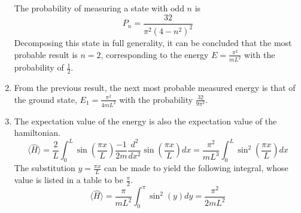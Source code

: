 \begin{sol}
\begin{enumerate}[label=\textbf{(\alph*)}]
The probability of measuring a state with odd $n$ is
\begin{equation}
    P_n=\frac{32}{\pi^2(4-n^2)^2}
\end{equation}
Decomposing this state in full generality, it can be concluded that the most probable result is $n=2$, corresponding to the energy $\displaystyle{E=\frac{\pi^2}{mL^2}}$ with the probability of $\displaystyle{\frac{1}{2}}$.
\item
From the previous result, the next most probable measured energy is that of the ground state, $\displaystyle{E_1=\frac{\pi^2}{4mL^2}}$ with the probability $\displaystyle{\frac{32}{9\pi^2}}$.
\item
The expectation value of the energy is also the expectation value of the hamiltonian.
\begin{equation}
    \langle\hat{H}\rangle=\frac{2}{L}\int_0^L\sin(\frac{\pi x}{L})\frac{-1}{2m}\frac{d^2}{dx^2}\sin(\frac{\pi x}{L})dx=\frac{\pi^2}{mL^3}\int_0^L\sin^2(\frac{\pi x}{L})dx
\end{equation}
The substitution $y=\frac{\pi x}{L}$ can be made to yield the following integral, whose value is listed in a table to be $\frac{\pi}{2}$.
\begin{equation}
    \langle\hat{H}\rangle=\frac{\pi}{mL^2}\int_0^\pi\sin^2(y)dy=\frac{\pi^2}{2mL^2}
\end{equation}
\end{enumerate}
\end{sol}